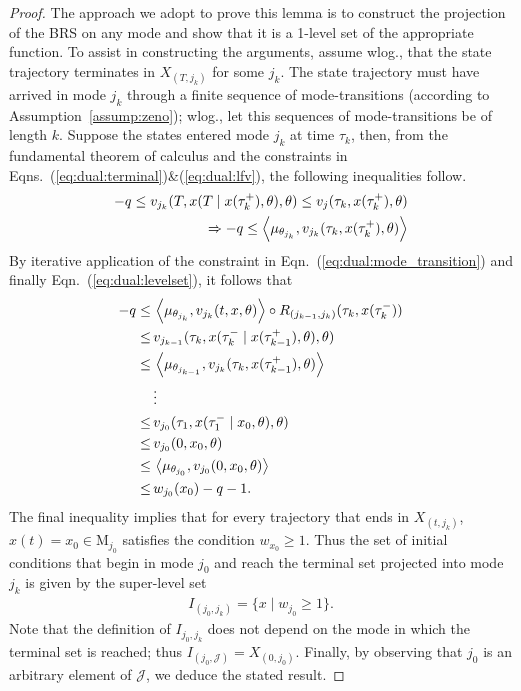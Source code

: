     \begin{proof}
    The approach we adopt to prove this lemma is to construct the projection of the BRS on any mode and show that it is a 1-level set of the appropriate function. To assist in constructing the arguments, assume wlog., that the state trajectory terminates in $X_{(T,j_k)}$ for some $j_k$. The state trajectory must have arrived in mode $j_k$ through a finite sequence of mode-transitions (according to Assumption~\ref{assump:zeno}); wlog., let this sequences of mode-transitions be of length $k$. Suppose the states entered mode $j_k$ at time $\tau_k$, then, from the fundamental theorem of calculus and the constraints in Eqns.~(\ref{eq:dual:terminal})\&(\ref{eq:dual:lfv}), the following inequalities follow.
    \begin{align}
      -q\le v_{j_k}(T,x(T\mid x(\tau_k^+),\theta),\theta)\le v_j(\tau_k,x(\tau_k^+),\theta)\\
      \Rightarrow -q\le \left\langle \mu_{\theta_{j_k}},v_{j_k}(\tau_k,x(\tau_k^+),\theta)\right\rangle
    \end{align}
    By iterative application of the constraint in Eqn.~(\ref{eq:dual:mode_transition}) and finally Eqn.~(\ref{eq:dual:levelset}), it follows that
    \begin{align}
      -q\le&\, \left\langle \mu_{\theta_{j_k}},v_{j_k}(t,x,\theta)\right\rangle\circ R_{(j_{k-1},j_{k})}(\tau_{k},x(\tau_{k}^-))\\
      \le&\, v_{j_{k-1}}(\tau_{k},x(\tau_{k}^-\mid x(\tau_{k-1}^+),\theta),\theta)\\
      \le &\, \left\langle \mu_{\theta_{j_{k-1}}},v_{j_k}(\tau_k,x(\tau_{k-1}^+),\theta)\right\rangle\\\nonumber
      &\,\vdots\\
      \le &\,v_{j_0}(\tau_1,x(\tau_1^-\mid x_0,\theta),\theta)\\
      \le &\,v_{j_0}(0,x_0,\theta)\\
      \le &\,\left\langle \mu_{\theta_{j_0}},v_{j_0}(0,x_0,\theta)\right\rangle\\
      \le &\, w_{j_0}(x_0)-q-1.
    \end{align}
    The final inequality implies that for every trajectory that ends in $X_{(t,j_k)}$, $x(t)=x_0\in \mathrm M_{j_0}$  satisfies the condition $w_{x_0}\ge 1$. Thus the set of initial conditions that begin in mode $j_0$ and reach the terminal set projected into mode $j_k$ is given by the super-level set
    \begin{align}
      I_{(j_0,j_k)}=\{x\mid w_{j_0}\ge 1\}.
    \end{align}
    Note that the definition of $I_{j_0,j_k}$ does not depend on the mode in which the terminal set is reached; thus \mbox{$I_{(j_0,\mathcal J)}=X_{(0,j_0)}$}. Finally, by observing that $j_0$ is an arbitrary element of $\mathcal J$, we deduce the stated result.
    \end{proof}
